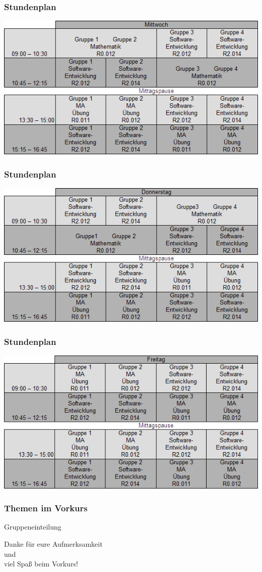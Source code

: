 \documentclass{beamer}
\begin{document}
	\begin{frame}
		\frametitle{Stundenplan}
		\includegraphics[width=1\textwidth]{mittwoch.png}
	\end{frame}
	
	\begin{frame}
		\frametitle{Stundenplan}
		\includegraphics[width=1\textwidth]{donnerstag.png}
	\end{frame}
	
	\begin{frame}
		\frametitle{Stundenplan}
		\includegraphics[width=1\textwidth]{freitag.png}
	\end{frame}
	
	\begin{frame}
		\frametitle{Themen im Vorkurs}
		Gruppeneinteilung
	\end{frame}
	
	\begin{frame}
		\center Danke für eure Aufmerksamkeit\\ und\\ viel Spaß beim Vorkurs!
	\end{frame}
\end{document}
